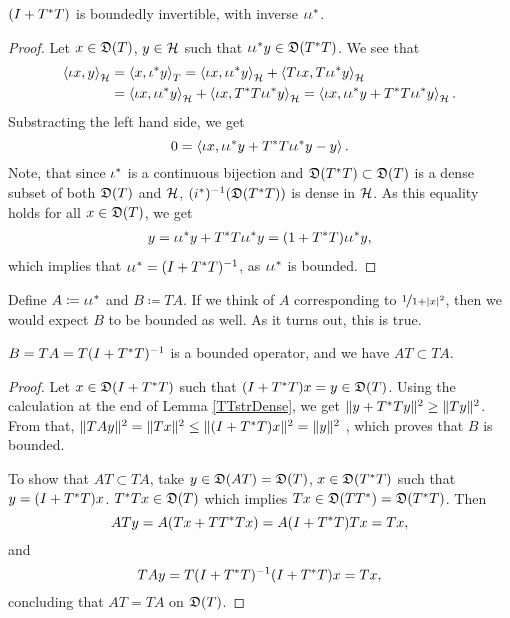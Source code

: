 \begin{prop}
 $(I + T ^{*} T)$ is boundedly
 invertible, with inverse $\iota \iota ^{*}$.
\end{prop}
\begin{proof}
  Let $x \in \mathfrak{D}(T)$, $y \in \mathcal{H}$ such that 
  $\iota  \iota ^{*} y \in \mathfrak{D}(T^{*} T)$.
  We see that
  \begin{align*}
\left\langle \iota x, y \right\rangle_{\mathcal{H}} &= \left\langle x, \iota ^{*} y \right\rangle_T = 
  \left\langle \iota x,\iota \iota ^{*} y \right\rangle_{\mathcal{H}} +
  \left\langle  T \iota x, T \iota \iota ^{*} y \right\rangle_{\mathcal{H}} \\
  &=\left\langle \iota x, \iota \iota ^{*} y \right\rangle_{\mathcal{H}}  +
  \left\langle \iota x , T ^{*} T \iota \iota ^{*} y \right\rangle_{\mathcal{H}}  =
  \left\langle \iota x, \iota \iota ^{*} y + T^{*} T \iota \iota ^{*} y \right\rangle_{\mathcal{H}} .
  \end{align*}
    Substracting the left hand side, we get
  \[
   0 = \left\langle \iota x , \iota \iota ^{*} y + T^{*} T \iota \iota ^{*} y - y \right\rangle.
  \]
  Note, that since $\iota ^{*}$ is a continuous bijection and $\mathfrak{D}(T ^{*} T)
  \subset \mathfrak{D}(T)$ is a
  dense subset of both $\mathfrak{D}(T)$ and $\mathcal{H}$, $(i ^{*}) ^{-1} (\mathfrak{D}(T ^{*} T))$ is dense
  in $\mathcal{H}$. As this equality holds for all $x \in \mathfrak{D}(T)$, we get
  \begin{align*}
  y=\iota \iota ^{*} y + T^{*} T \iota \iota ^{*} y 
  = (1+ T ^{*} T) \iota \iota ^{*} y,
  \end{align*}
  which implies that $ \iota \iota ^{*} = ( I + T ^{*} T) ^{-1}$,
  as $\iota \iota^{*} $ is bounded.
\end{proof}

Define $A \coloneqq \iota \iota ^{*}$ and $B \coloneqq TA$. 
If we think of $A$ corresponding to $\nicefrac{1}{1 + |x|^2}$, then we would expect
$B$ to be bounded as well.
As it turns out, this is true.
\begin{lem}\label{BBounded}
 $B = TA = T(I + T ^{*} T)^{-1}$ is a bounded operator, and we have
 $AT \subset TA$.
\end{lem}



\begin{proof}
 Let $x \in \mathfrak{D}(I + T ^{*} T)$ such that $(I + T ^{*} T)x = y \in \mathfrak{D}(T)$.
 Using the calculation at the end of Lemma \ref{TTstrDense}, we get 
 $\| y + T^{*} T y \|^2 \geq \|Ty\|^2$.
From that, $\| TAy\|^2 = \| Tx \| ^2 \leq \| (I + T ^{*} T)x \|^2 = \| y \| ^2$
, which proves that $B$ is bounded. 

To show that $AT \subset TA$, take $y \in \mathfrak{D}(AT) = \mathfrak{D}(T)$,
$x \in \mathfrak{D}(T ^{*} T)$ such that $y = ( I +  T ^{*} T)x$. $T ^{*} T x \in \mathfrak{D}(T)$
which implies $Tx \in \mathfrak{D}(TT^{*}) = \mathfrak{D}(T^{*} T)$. Then 
\[
 ATy = A(Tx + T T^{*} T x) = A(I + T^{*} T)Tx= Tx,
\]
and
\[
 TAy= T(I+ T^{*} T)^{-1} (I + T ^{*} T)x=Tx,
\]
concluding that $AT = TA$ on $\mathfrak{D}(T)$.

\end{proof}

